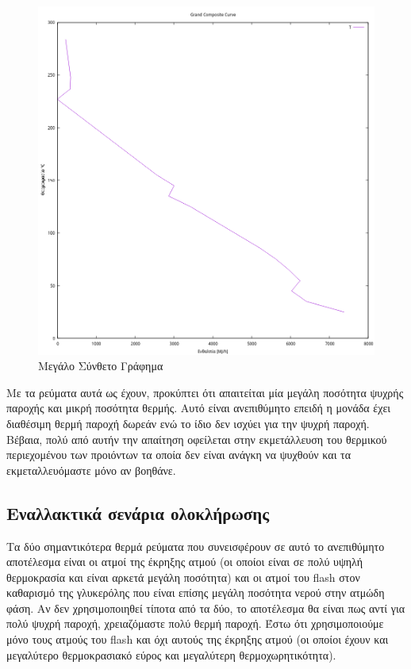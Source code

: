 \documentclass[11pt]{article}
\begin{document}
\begin{figure}[htbp]
\centering
\includegraphics[width=.9\linewidth]{Diagrams/grand_composite_curve.png}
\caption{Μεγάλο Σύνθετο Γράφημα}
\end{figure}

Με τα ρεύματα αυτά ως έχουν, προκύπτει ότι απαιτείται μία μεγάλη ποσότητα ψυχρής παροχής και μικρή ποσότητα θερμής. Αυτό είναι ανεπιθύμητο επειδή η μονάδα έχει διαθέσιμη θερμή παροχή δωρεάν ενώ το ίδιο δεν ισχύει για την ψυχρή παροχή. Βέβαια, πολύ από αυτήν την απαίτηση οφείλεται στην εκμετάλλευση του θερμικού περιεχομένου των προιόντων τα οποία δεν είναι ανάγκη να ψυχθούν και τα εκμεταλλευόμαστε μόνο αν βοηθάνε.

\subsection{Εναλλακτικά σενάρια ολοκλήρωσης}
\label{sec:org3b0904a}

Τα δύο σημαντικότερα θερμά ρεύματα που συνεισφέρουν σε αυτό το ανεπιθύμητο αποτέλεσμα είναι οι ατμοί της έκρηξης ατμού (οι οποίοι είναι σε πολύ υψηλή θερμοκρασία και είναι αρκετά μεγάλη ποσότητα) και οι ατμοί του flash στον καθαρισμό της γλυκερόλης που είναι επίσης μεγάλη ποσότητα νερού στην ατμώδη φάση. Αν δεν χρησιμοποιηθεί τίποτα από τα δύο, το αποτέλεσμα θα είναι πως αντί για πολύ ψυχρή παροχή, χρειαζόμαστε πολύ θερμή παροχή. Έστω ότι χρησιμοποιούμε μόνο τους ατμούς του flash και όχι αυτούς της έκρηξης ατμού (οι οποίοι έχουν και μεγαλύτερο θερμοκρασιακό εύρος και μεγαλύτερη θερμοχωρητικότητα).
\end{document}
